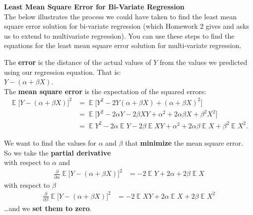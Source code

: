 \documentclass[11pt]{article}
\DeclareMathOperator\E{\mathbb{E}}
\begin{document}
\textbf{Least Mean Square Error for Bi-Variate Regression}\\

The below illustrates the process we could have taken to find the least mean square error solution for bi-variate regression (which Homework 2 gives and asks us to extend to multivariate regression). You can use these steps to find the equations for the least mean square error solution for multi-variate regression.\\
\hline
\vspace{15pt}


The \textbf{error} is the distance of the actual values of \(Y\) from the values we predicted using our regression equation. That is:\\

\(Y - (\alpha + \beta X)\).\\

The \textbf{mean square error} is the expectation of the squared errors:
\begin{align*}
\E\bigl[Y - (\alpha + \beta X)\bigr]^{2} &= \E\bigl[Y^{2} - 2Y(\alpha + \beta X) + (\alpha + \beta X)^{2}\bigr]\\
&= \E\bigl[Y^{2} - 2 \alpha Y - 2\beta X Y + \alpha^{2} + 2 \alpha \beta X + \beta^{2} X^{2}\bigr]\\
&= \E Y^{2} - 2 \alpha \E Y - 2 \beta \E X Y + \alpha^{2} + 2 \alpha \beta \E X + \beta^{2} \E X^{2}
.
\end{align*}

We want to find the values for \(\alpha\) and \(\beta\) that \textbf{minimize} the mean square error.\\

So we take the \textbf{partial derivative}\\
with respect to \(\alpha\) and
\begin{align*}
\frac{\partial}{\partial\alpha} \E\bigl[Y - (\alpha + \beta X)\bigr]^{2} &= -2 \E Y + 2 \alpha + 2 \beta \E X
\end{align*}
with respect to \(\beta\)
\begin{align*}
\frac{\partial}{\partial\beta} \E\bigl[Y - (\alpha + \beta X)\bigr]^{2} &= -2 \E X Y + 2 \alpha \E X + 2 \beta \E X^{2}
\end{align*}
\ldots and we \textbf{set them to zero}.\\
\end{document}
